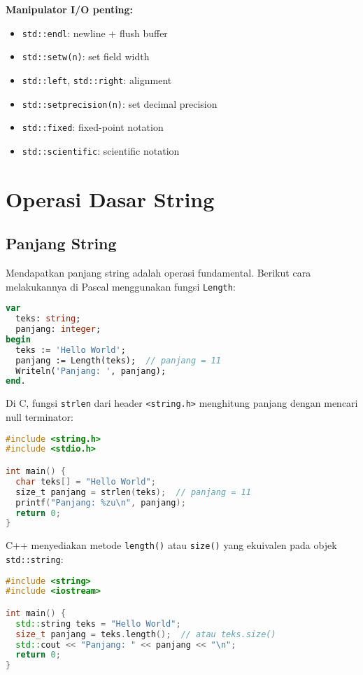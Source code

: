 \documentclass[../main.tex]{subfiles}
\begin{document}
\textbf{Manipulator I/O penting:}
\begin{itemize}
  \item \texttt{std::endl}: newline + flush buffer
  \item \texttt{std::setw(n)}: set field width
  \item \texttt{std::left}, \texttt{std::right}: alignment
  \item \texttt{std::setprecision(n)}: set decimal precision
  \item \texttt{std::fixed}: fixed-point notation
  \item \texttt{std::scientific}: scientific notation
\end{itemize}

\section{Operasi Dasar String}

\subsection{Panjang String}

Mendapatkan panjang string adalah operasi fundamental. Berikut cara melakukannya di Pascal menggunakan fungsi \texttt{Length}:

\begin{lstlisting}[language=Pascal, caption={Panjang string di Pascal}]
var
  teks: string;
  panjang: integer;
begin
  teks := 'Hello World';
  panjang := Length(teks);  // panjang = 11
  Writeln('Panjang: ', panjang);
end.
\end{lstlisting}

Di C, fungsi \texttt{strlen} dari header \texttt{<string.h>} menghitung panjang dengan mencari null terminator:

\begin{lstlisting}[language=C, caption={Panjang string di C}]
#include <string.h>
#include <stdio.h>

int main() {
  char teks[] = "Hello World";
  size_t panjang = strlen(teks);  // panjang = 11
  printf("Panjang: %zu\n", panjang);
  return 0;
}
\end{lstlisting}

C++ menyediakan metode \texttt{length()} atau \texttt{size()} yang ekuivalen pada objek \texttt{std::string}:

\begin{lstlisting}[language=C++, caption={Panjang string di C++}]
#include <string>
#include <iostream>

int main() {
  std::string teks = "Hello World";
  size_t panjang = teks.length();  // atau teks.size()
  std::cout << "Panjang: " << panjang << "\n";
  return 0;
}
\end{lstlisting}
\end{document}
